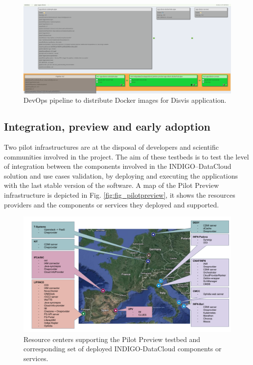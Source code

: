 \documentclass[journal]{IEEEtran}
\begin{document}
\begin{figure}
\centering
\includegraphics[width=\textwidth]{images/disvis.png}
\caption{DevOps pipeline to distribute Docker images for Disvis application.}
\label{fig:fig_disvis}
\end{figure}

\subsection{Integration, preview and early adoption}

Two pilot infrastructures are at the disposal of developers and scientific
communities involved in the project. The aim of these testbeds is to test the
level of integration between the components involved in the INDIGO--DataCloud
solution and use cases validation, by deploying and executing the applications
with the last stable version of the software. A map of the Pilot Preview
infrastructure is depicted in Fig. \ref{fig:fig_pilotpreview}, it shows the
resources providers and the components or services they deployed and supported.

\begin{figure}
\centering
\includegraphics[width=\textwidth]{images/pilotpreview.png}
\caption{Resource centers supporting the Pilot Preview testbed and corresponding
set of deployed INDIGO-DataCloud components or services.}
\label{fig:fig_confman}
\end{figure}
\end{document}
